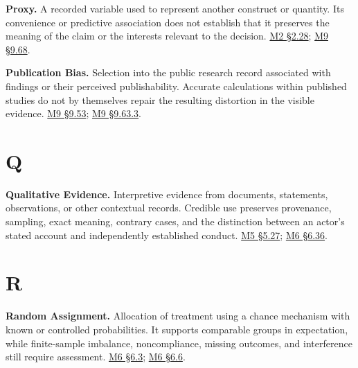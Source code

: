 \noindent\textbf{Proxy.} A recorded variable used to represent another construct
or quantity. Its convenience or predictive association does not
establish that it preserves the meaning of the claim or the interests
relevant to the decision.
\href{Marketing_Analytics_Lecture_Notes.pdf\#M02-electricity-prices-household-bills-and-the-unit-of-harm}{M2
§2.28};
\hyperref[M09-worked-assessments-of-the-missing-object]{M9
§9.68}.

\noindent\textbf{Publication Bias.} Selection into the public research record
associated with findings or their perceived publishability. Accurate
calculations within published studies do not by themselves repair the
resulting distortion in the visible evidence.
\hyperref[M09-undone-science-and-the-distribution-of-evidence]{M9
§9.53};
\hyperref[M09-selection-before-and-after-estimation]{M9
§9.63.3}.

\par{}
\hypertarget{module-q}{%
\section*{Q}\label{module-q}}

\noindent\textbf{Qualitative Evidence.} Interpretive evidence from documents,
statements, observations, or other contextual records. Credible use
preserves provenance, sampling, exact meaning, contrary cases, and the
distinction between an actor's stated account and independently
established conduct.
\href{Marketing_Analytics_Lecture_Notes.pdf\#M05-utility-disclosures-as-qualitative-evidence}{M5
§5.27};
\href{Marketing_Analytics_Lecture_Notes.pdf\#M06-qualitative-mechanisms-and-a-causal-comparison}{M6
§6.36}.

\par{}
\hypertarget{module-r}{%
\section*{R}\label{module-r}}

\noindent\textbf{Random Assignment.} Allocation of treatment using a chance
mechanism with known or controlled probabilities. It supports comparable
groups in expectation, while finite-sample imbalance, noncompliance,
missing outcomes, and interference still require assessment.
\href{Marketing_Analytics_Lecture_Notes.pdf\#M06-designing-an-experiment-around-the-decision}{M6
§6.3};
\href{Marketing_Analytics_Lecture_Notes.pdf\#M06-implementation-checks-that-protect-the-comparison}{M6
§6.6}.

